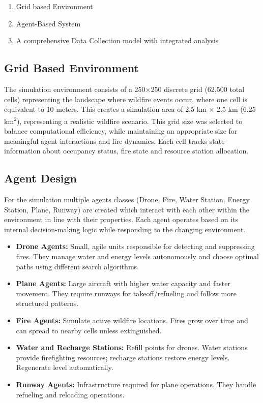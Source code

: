 \documentclass[twoside]{article}
\begin{document}
\begin{enumerate}
  \item Grid based Environment
  \item Agent-Based System
  \item A comprehensive Data Collection model with integrated analysis
\end{enumerate}

\subsection{Grid Based Environment}
The simulation environment consists of a 250×250 discrete grid (62,500 total cells) representing the landscape where wildfire events occur, where one cell is equivalent to 10 meters. This creates a simulation area of 2.5 km × 2.5 km (6.25 km\textsuperscript{2}), representing a realistic wildfire scenario. This grid size was selected to balance computational efficiency, while maintaining an appropriate size for meaningful agent interactions and fire dynamics. Each cell tracks state information about occupancy status, fire state and resource station allocation.

\subsection{Agent Design}

For the simulation multiple agents classes (Drone, Fire, Water Station, Energy Station, Plane, Runway) are created which interact with each other within the environment in line with their properties. Each agent operates based on its internal decision-making logic while responding to the changing environment.
\begin{itemize}
  \item \textbf{Drone Agents:} Small, agile units responsible for detecting and suppressing fires. They manage water and energy levels autonomously and choose optimal paths using different search algorithms.
  \item \textbf{Plane Agents:} Large aircraft with higher water capacity and faster movement. They require runways for takeoff/refueling and follow more structured patterns.
  \item \textbf{Fire Agents:} Simulate active wildfire locations. Fires grow over time and can spread to nearby cells unless extinguished.
  \item \textbf{Water and Recharge Stations:} Refill points for drones. Water stations provide firefighting resources; recharge stations restore energy levels. Regenerate level automatically.
  \item \textbf{Runway Agents:} Infrastructure required for plane operations. They handle refueling and reloading operations.
\end{itemize}
\end{document}
